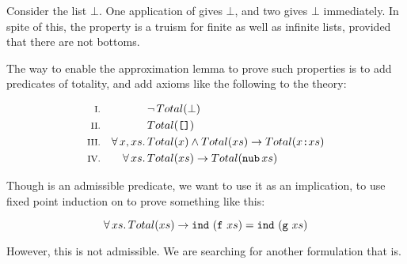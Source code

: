 Consider the list $\bot$. One application of 
gives $\bot$, and two gives $\bot$ immediately. In spite of
this, the property is a truism for finite as well as infinite lists,
provided that there are not bottoms.

The way to enable the approximation lemma to prove such properties is
to add predicates of totality, and add axioms like the following to
the theory:

\begin{align*}
\rom{1} &&             & \neg \, Total(\bot) \\
\rom{2} &&             & Total(\hs{[]}) \\
\rom{3} && \faa{x}{xs} & Total(x) \wedge Total(xs) \rightarrow Total(x\hs{:}xs) \\
\rom{4} && \fa{xs}     & Total(xs) \rightarrow Total(\hs{nub} \, xs) \\
\end{align*}

Though  is an admissible predicate, we want to use it as an
implication, to use fixed point induction on  to prove
something like this:

\begin{equation*}
\fa{xs} Total(xs)\rightarrow \hs{ind} \w (\hs{f} \w xs) = \hs{ind} \w (\hs{g} \w xs)
\end{equation*}

\noindent
However, this is not admissible. We are searching for another
formulation that is.

